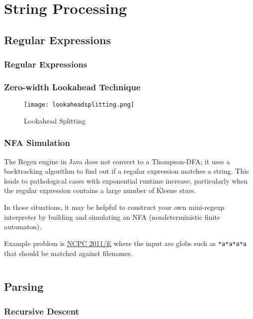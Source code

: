 \chapter{String Processing}

\section{Regular Expressions}

\subsection{Regular Expressions}

\subsection{Zero-width Lookahead Technique}

\begin{figure}
    \centering
    \texttt{[image: lookaheadsplitting.png]}
    \caption{Lookahead Splitting}
    \label{fig:lookaheadsplit}
\end{figure}

\subsection{NFA Simulation}

The Regex engine in Java does not convert to a Thompson-DFA; it uses a backtracking algorithm
to find out if a regular expression matches a string.  This leads to pathological cases with
exponential runtime increase, particularly when the regular expression contains a large number
of Kleene stars.

In those situations, it may be helpful to construct your own mini-regexp interpreter by building
and simulating an NFA (nondeterministic finite automaton).

Example problem is \href{http://ncpc.idi.ntnu.no/ncpc2011/ncpc2011problems.pdf}{NCPC 2011/E}
where the input are globs such as \texttt{*a*a*a*a} that should be matched against filenames.

\inputminted{python}{code/ls.py}

\section{Parsing}
\subsection{Recursive Descent}

